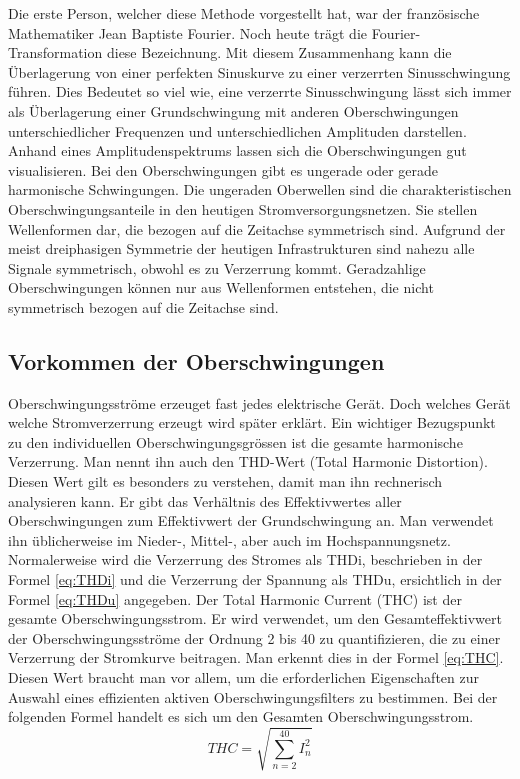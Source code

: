 Die erste Person, welcher diese Methode vorgestellt hat, war der französische Mathematiker Jean Baptiste Fourier. Noch heute trägt die Fourier-Transformation diese Bezeichnung. Mit diesem Zusammenhang kann die Überlagerung von einer perfekten Sinuskurve zu einer verzerrten Sinusschwingung führen. Dies Bedeutet so viel wie, eine verzerrte Sinusschwingung lässt sich immer als Überlagerung einer Grundschwingung mit anderen Oberschwingungen unterschiedlicher Frequenzen und unterschiedlichen Amplituden darstellen. Anhand eines Amplitudenspektrums lassen sich die Oberschwingungen gut visualisieren. 
Bei den Oberschwingungen gibt es ungerade oder gerade harmonische Schwingungen.
Die ungeraden Oberwellen sind die charakteristischen Oberschwingungsanteile in den heutigen Stromversorgungsnetzen. Sie stellen Wellenformen dar, die bezogen auf die Zeitachse symmetrisch sind. Aufgrund der meist dreiphasigen Symmetrie der heutigen Infrastrukturen sind nahezu alle Signale symmetrisch, obwohl es zu Verzerrung kommt. Geradzahlige Oberschwingungen können nur aus Wellenformen entstehen, die nicht symmetrisch bezogen auf die Zeitachse sind.

\subsection{Vorkommen der Oberschwingungen}
Oberschwingungsströme erzeuget fast jedes elektrische Gerät. Doch welches Gerät welche Stromverzerrung erzeugt wird später erklärt. Ein wichtiger Bezugspunkt zu den individuellen Oberschwingungsgrössen ist die gesamte harmonische Verzerrung. Man nennt ihn auch den THD-Wert (Total Harmonic Distortion). Diesen Wert gilt es besonders zu verstehen, damit man ihn rechnerisch analysieren kann. Er gibt das Verhältnis des Effektivwertes aller Oberschwingungen zum Effektivwert der Grundschwingung an. Man verwendet ihn üblicherweise im Nieder-, Mittel-, aber auch im Hochspannungsnetz. Normalerweise wird die Verzerrung des Stromes als THDi, beschrieben in der Formel \ref{eq:THDi} und die Verzerrung der Spannung als THDu, ersichtlich in der Formel \ref{eq:THDu} angegeben. Der Total Harmonic Current (THC) ist der gesamte Oberschwingungsstrom. Er wird verwendet, um den Gesamteffektivwert der Oberschwingungsströme der Ordnung 2 bis 40 zu quantifizieren, die zu einer Verzerrung der Stromkurve beitragen. Man erkennt dies in der Formel \ref{eq:THC}. Diesen Wert braucht man vor allem, um die erforderlichen Eigenschaften zur Auswahl eines effizienten aktiven Oberschwingungsfilters zu bestimmen.
Bei der folgenden Formel handelt es sich um den Gesamten Oberschwingungsstrom.
\begin{equation}\label{eq:THC}
THC = {\sqrt{\sum_{n=2}^{40} I_n^2}}
\end{equation}



